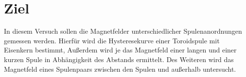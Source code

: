 \section{Ziel}
In diesem Versuch sollen die Magnetfelder unterschiedlicher Spulenanordnungen gemessen werden.
Hierfür wird die Hysteresekurve einer Toroidspule mit Eisenkern bestimmt,
Außerdem wird je das Magnetfeld einer langen und einer kurzen Spule in Abhängigkeit des Abstands ermittelt.
Des Weiteren wird das Magnetfeld eines Spulenpaars zwischen den Spulen und außerhalb untersucht.